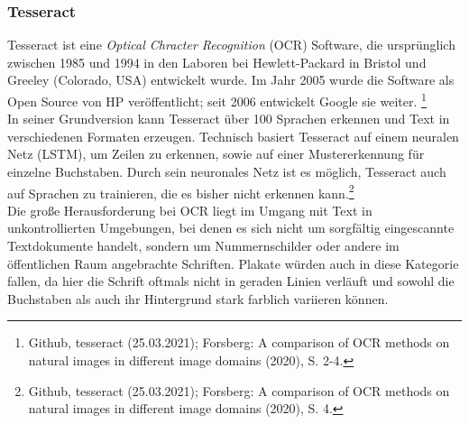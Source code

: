 \documentclass[a4paper,12pt,ngerman]{article}
\begin{document}
\subsubsection{Tesseract}
Tesseract ist eine \textit{Optical Chracter Recognition} (OCR) Software, die ursprünglich zwischen 1985 und 1994 in den Laboren bei Hewlett-Packard in Bristol und Greeley (Colorado, USA) entwickelt wurde. Im Jahr 2005 wurde die Software als Open Source von HP veröffentlicht; seit 2006 entwickelt Google sie weiter. \footnote{Github, tesseract (25.03.2021); Forsberg: A comparison of OCR methods on natural images in different image domains (2020), S. 2-4.} \\
In seiner Grundversion kann Tesseract über 100 Sprachen erkennen und Text in verschiedenen Formaten erzeugen. Technisch basiert Tesseract auf einem neuralen Netz (LSTM), um Zeilen zu erkennen, sowie auf einer Mustererkennung für einzelne Buchstaben. Durch sein neuronales Netz ist es möglich, Tesseract auch auf Sprachen zu trainieren, die es bisher nicht erkennen kann.\footnote{Github, tesseract (25.03.2021); Forsberg: A comparison of OCR methods on natural images in different image domains (2020), S. 4. } \\
Die große Herausforderung bei OCR liegt im Umgang mit Text in unkontrollierten Umgebungen, bei denen es sich nicht um sorgfältig eingescannte Textdokumente handelt, sondern um Nummernschilder oder andere im öffentlichen Raum angebrachte Schriften. Plakate würden auch in diese Kategorie fallen, da hier die Schrift oftmals nicht in geraden Linien verläuft und sowohl die Buchstaben als auch ihr Hintergrund stark farblich variieren können.
\end{document}
